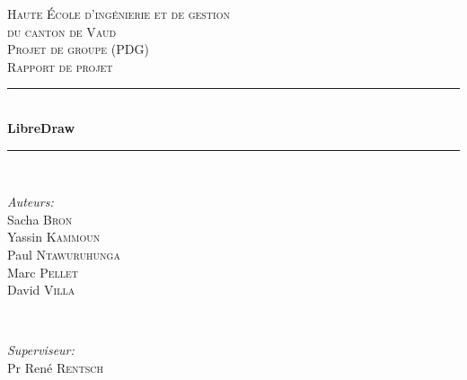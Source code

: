 \documentclass[11pt,a4paper,oldfontcommands]{memoir}
\begin{document}
\begin{titlepage}

\newcommand{\HRule}{\rule{\linewidth}{0.5mm}}

\center


\textsc{\LARGE Haute École d'ingénierie et de gestion \\du canton de Vaud}\\[1.5cm]
\textsc{\Large Projet de groupe (PDG)}\\[0.5cm]
\textsc{\large Rapport de projet}\\[0.5cm]


\HRule \\[0.8cm]
{ \huge \bfseries LibreDraw}\\[0.4cm]
\HRule \\[1.5cm]


\begin{minipage}{0.4\textwidth}
\begin{flushleft} \large
\emph{Auteurs:}\\
Sacha \textsc{Bron}\\
Yassin \textsc{Kammoun}\\
Paul \textsc{Ntawuruhunga}\\
Marc \textsc{Pellet}\\
David \textsc{Villa}
\end{flushleft}
\end{minipage}
~
\begin{minipage}{0.4\textwidth}
\begin{flushright} \large
\emph{Superviseur:} \\
Pr René \textsc{Rentsch}
\break
\break
\break
\break
\end{flushright}
\end{minipage}\\[4cm]


\end{titlepage}
\end{document}
